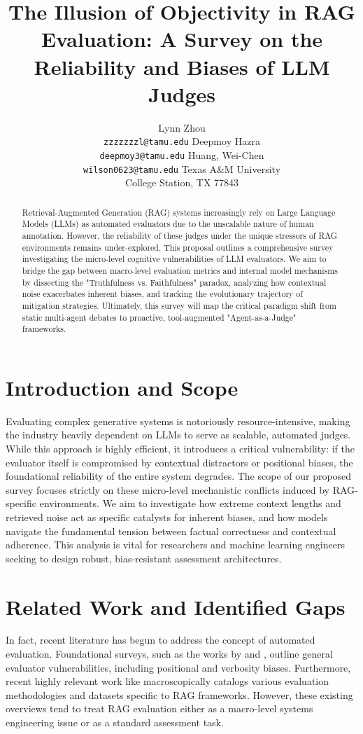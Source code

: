 \documentclass[11pt]{article}
\title{The Illusion of Objectivity in RAG Evaluation: A Survey on the Reliability and Biases of LLM Judges}
\author{Lynn Zhou \\
  \texttt{zzzzzzzl@tamu.edu} \And
  Deepmoy Hazra\\
  \texttt{deepmoy3@tamu.edu} \And
  Huang, Wei-Chen \\
  \texttt{wilson0623@tamu.edu} \AND
  Texas A\&M University \\
  College Station, TX 77843
}
\begin{document}
\maketitle
\begin{abstract}
Retrieval-Augmented Generation (RAG) systems increasingly rely on Large Language Models (LLMs) as automated evaluators due to the unscalable nature of human annotation. However, the reliability of these judges under the unique stressors of RAG environments remains under-explored. This proposal outlines a comprehensive survey investigating the micro-level cognitive vulnerabilities of LLM evaluators. We aim to bridge the gap between macro-level evaluation metrics and internal model mechanisms by dissecting the "Truthfulness vs. Faithfulness" paradox, analyzing how contextual noise exacerbates inherent biases, and tracking the evolutionary trajectory of mitigation strategies. Ultimately, this survey will map the critical paradigm shift from static multi-agent debates to proactive, tool-augmented "Agent-as-a-Judge" frameworks.
\end{abstract}

\section{Introduction and Scope}
Evaluating complex generative systems is notoriously resource-intensive, making the industry heavily dependent on LLMs to serve as scalable, automated judges. While this approach is highly efficient, it introduces a critical vulnerability: if the evaluator itself is compromised by contextual distractors or positional biases, the foundational reliability of the entire system degrades. The scope of our proposed survey focuses strictly on these micro-level mechanistic conflicts induced by RAG-specific environments. We aim to investigate how extreme context lengths and retrieved noise act as specific catalysts for inherent biases, and how models navigate the fundamental tension between factual correctness and contextual adherence. This analysis is vital for researchers and machine learning engineers seeking to design robust, bias-resistant assessment architectures.


\section{Related Work and Identified Gaps}
In fact, recent literature has begun to address the concept of automated evaluation. Foundational surveys, such as the works by \citet{gu2025surveyllmasajudge} and \citet{li-etal-2025-generation}, outline general evaluator vulnerabilities, including positional and verbosity biases. Furthermore, recent highly relevant work like \citet{Brehme_2025} macroscopically catalogs various evaluation methodologies and datasets specific to RAG frameworks. However, these existing overviews tend to treat RAG evaluation either as a macro-level systems engineering issue or as a standard assessment task. 
\end{document}
